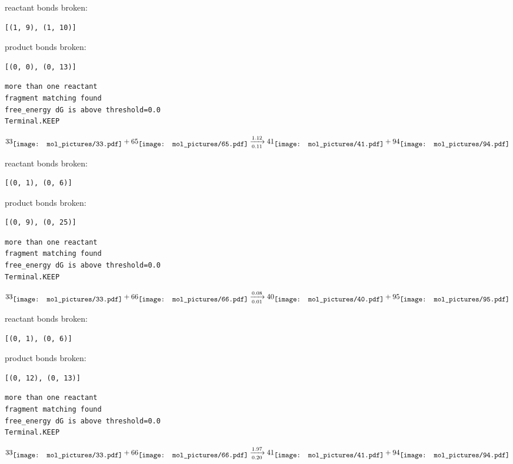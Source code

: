 \documentclass{article}
\begin{document}
reactant bonds broken:\begin{verbatim}
[(1, 9), (1, 10)]
\end{verbatim}
product bonds broken:\begin{verbatim}
[(0, 0), (0, 13)]
\end{verbatim}




\vspace{1cm}
\begin{verbatim}
more than one reactant
fragment matching found
free_energy dG is above threshold=0.0
Terminal.KEEP
\end{verbatim}
$$
33
\raisebox{-.5\height}{\texttt{[image: mol\_pictures/33.pdf]}}
+
65
\raisebox{-.5\height}{\texttt{[image: mol\_pictures/65.pdf]}}
\xrightarrow[0.11]{1.12}
41
\raisebox{-.5\height}{\texttt{[image: mol\_pictures/41.pdf]}}
+
94
\raisebox{-.5\height}{\texttt{[image: mol\_pictures/94.pdf]}}
$$


reactant bonds broken:\begin{verbatim}
[(0, 1), (0, 6)]
\end{verbatim}
product bonds broken:\begin{verbatim}
[(0, 9), (0, 25)]
\end{verbatim}




\vspace{1cm}
\begin{verbatim}
more than one reactant
fragment matching found
free_energy dG is above threshold=0.0
Terminal.KEEP
\end{verbatim}
$$
33
\raisebox{-.5\height}{\texttt{[image: mol\_pictures/33.pdf]}}
+
66
\raisebox{-.5\height}{\texttt{[image: mol\_pictures/66.pdf]}}
\xrightarrow[0.01]{0.08}
40
\raisebox{-.5\height}{\texttt{[image: mol\_pictures/40.pdf]}}
+
95
\raisebox{-.5\height}{\texttt{[image: mol\_pictures/95.pdf]}}
$$


reactant bonds broken:\begin{verbatim}
[(0, 1), (0, 6)]
\end{verbatim}
product bonds broken:\begin{verbatim}
[(0, 12), (0, 13)]
\end{verbatim}




\vspace{1cm}
\begin{verbatim}
more than one reactant
fragment matching found
free_energy dG is above threshold=0.0
Terminal.KEEP
\end{verbatim}
$$
33
\raisebox{-.5\height}{\texttt{[image: mol\_pictures/33.pdf]}}
+
66
\raisebox{-.5\height}{\texttt{[image: mol\_pictures/66.pdf]}}
\xrightarrow[0.20]{1.97}
41
\raisebox{-.5\height}{\texttt{[image: mol\_pictures/41.pdf]}}
+
94
\raisebox{-.5\height}{\texttt{[image: mol\_pictures/94.pdf]}}
$$
\end{document}

